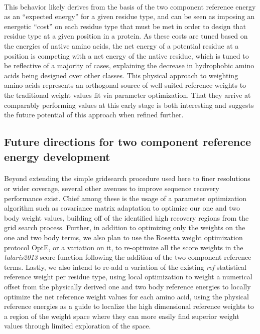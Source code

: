 \paragraph{}
This behavior likely derives from the basis of the two component reference energy as an ``expected energy'' for a given residue type, and can be seen as imposing an energetic ``cost'' on each residue type that must be met in order to design that residue type at a given position in a protein.
As these costs are tuned based on the energies of native amino acids, the net energy of a potential residue at a position is competing with a net energy of the native residue, which is tuned to be reflective of a majority of cases, explaining the decrease in hydrophobic amino acids being designed over other classes.
This physical approach to weighting amino acids represents an orthogonal source of well-suited reference weights to the traditional weight values fit via parameter optimization.
That they arrive at comparably performing values at this early stage is both interesting and suggests the future potential of this approach when refined further.

\subsection{Future directions for two component reference energy development}
\paragraph{}
Beyond extending the simple gridsearch procedure used here to finer resolutions or wider coverage, several other avenues to improve sequence recovery performance exist.
Chief among these is the usage of a parameter optimization algorithm such as covariance matrix adaptation\cite{ostermeier_step-size_1994} to optimize our one and two body weight values, building off of the identified high recovery regions from the grid search process.
Further, in addition to optimizing only the weights on the one and two body terms, we also plan to use the Rosetta weight optimization protocol OptE\cite{leaver-fay_chapter_2013}, or a variation on it, to re-optimize all the score weights in the \textit{talaris2013} score function following the addition of the two component reference terms.
Lastly, we also intend to re-add a variation of the existing \textit{ref} statistical reference weight per residue type, using local optimization to weight a numerical offset from the physically derived one and two body reference energies to locally optimize the net reference weight values for each amino acid, using the physical reference energies as a guide to localize the high dimensional reference weights to a region of the weight space where they can more easily find superior weight values through limited exploration of the space.

